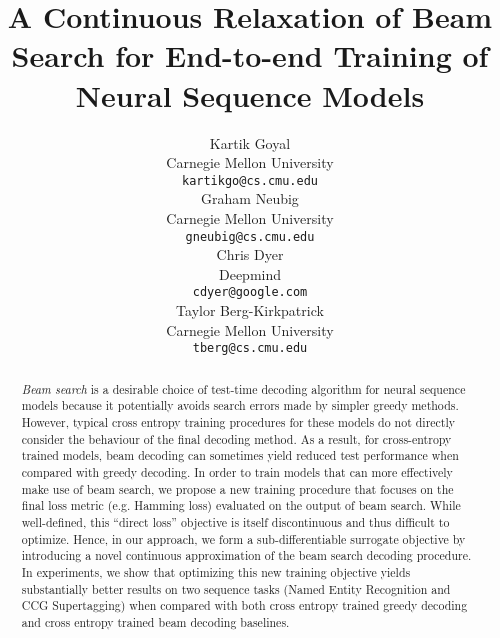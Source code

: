 \documentclass[letterpaper]{article} %
\begin{document}
%
\title{A Continuous Relaxation of Beam Search for End-to-end Training of Neural Sequence Models}
\author{Kartik Goyal\\
Carnegie Mellon University\\
\texttt{kartikgo@cs.cmu.edu}\\
\And
  Graham Neubig\\
  Carnegie Mellon University \\
  \texttt{gneubig@cs.cmu.edu} \\
  \And
  Chris Dyer\\
  Deepmind\\
  \texttt{cdyer@google.com} \\
  \And
  Taylor Berg-Kirkpatrick\\
  Carnegie Mellon University\\
  \texttt{tberg@cs.cmu.edu} \\
}
\maketitle
\begin{abstract}
\textit{Beam search} is a desirable choice of test-time decoding algorithm for neural sequence models because it potentially avoids search errors made by simpler greedy methods. However, typical cross entropy training procedures for these models do not directly consider the behaviour of the final decoding method. As a result, for cross-entropy trained models, beam decoding can sometimes yield reduced test performance when compared with greedy decoding. In order to train models that can more effectively make use of beam search, we propose a new training procedure that focuses on the final loss metric (e.g. Hamming loss) evaluated on the output of beam search. While well-defined, this ``direct loss'' objective is itself discontinuous and thus difficult to optimize. Hence, in our approach, we form a sub-differentiable surrogate objective by introducing a novel continuous approximation of the beam search decoding procedure. In experiments, we show that optimizing this new training objective yields substantially better results on two sequence tasks (Named Entity Recognition and CCG Supertagging) when compared with both cross entropy trained greedy decoding and cross entropy trained beam decoding baselines.
\end{abstract}
\end{document}
